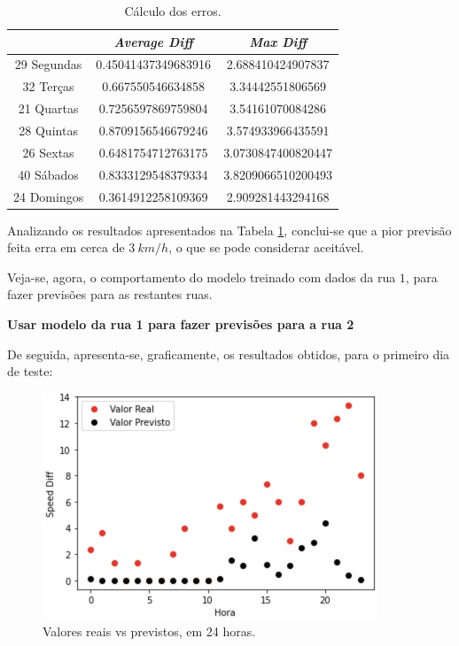 \documentclass[a4paper, 12pt]{article}
\begin{document}
\begin{table}[H]
\centering
\begin{tabular}{||c||c|c||}
	\hline\hline
	 & \textit{Average Diff} & \textit{Max Diff} \\
	\hline\hline
	29 Segundas & 
	0.45041437349683916
 & 2.688410424907837\\
	\hline
	32 Terças  &
	0.667550546634858
 & 3.34442551806569\\
	\hline
	21 Quartas & 
	0.7256597869759804
 & 3.54161070084286
 \\
	\hline
	28 Quintas  & 
	0.8709156546679246
 & 3.574933966435591
   \\
	\hline
	26 Sextas & 
	0.6481754712763175 & 3.0730847400820447
 \\
	\hline
	40 Sábados  & 
	0.8333129548379334 & 3.8209066510200493   \\
	\hline
	24 Domingos & 
0.3614912258109369
 & 
2.909281443294168
 \\
	\hline\hline
\end{tabular}
\label{table:rua1}
\caption{Cálculo dos erros.}
\end{table}

Analizando os resultados apresentados na Tabela \ref{table:rua1}, conclui-se que a pior previsão feita erra em cerca de $3 \ km/h$, o que se pode considerar aceitável.

Veja-se, agora, o comportamento do modelo treinado com dados da rua $1$, para fazer previsões para as restantes ruas.

\vspace{0.5cm}
\textbf{Usar modelo da rua 1 para fazer previsões para a rua 2}

De seguida, apresenta-se, graficamente, os resultados obtidos, para o primeiro dia de teste:

\begin{figure}[H]
	\centering
	\includegraphics[width=10cm]{resultados/real_prev_mod1_rua2.png}
	\caption{Valores reais vs previstos, em 24 horas.}
\end{figure}
\end{document}
